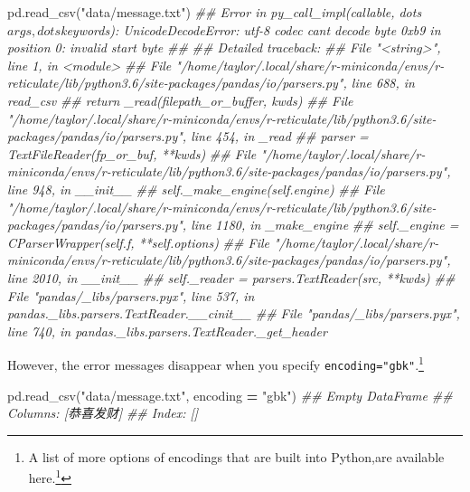 \documentclass[
  12pt,
  krantz2]{krantz}
\makeatletter
\newenvironment{Shaded}{\begin{snugshade}}{\end{snugshade}}
\newcommand{\CommentTok}[1]{\textcolor[rgb]{0.37,0.37,0.37}{\textit{#1}}}
\newcommand{\NormalTok}[1]{#1}
\newcommand{\OperatorTok}[1]{\textcolor[rgb]{0.43,0.43,0.43}{\textbf{#1}}}
\newcommand{\StringTok}[1]{\textcolor[rgb]{0.5,0.5,0.5}{#1}}
\renewcommand{\href}[2]{#2\footnote{\url{#1}}}
\newenvironment{kframe}{%
\medskip{}
\setlength{\fboxsep}{.8em}
 \def\at@end@of@kframe{}%
 \ifinner\ifhmode%
  \def\at@end@of@kframe{\end{minipage}}%
  \begin{minipage}{\columnwidth}%
 \fi\fi%
 \def\FrameCommand##1{\hskip\@totalleftmargin \hskip-\fboxsep
 \colorbox{shadecolor}{##1}\hskip-\fboxsep
     \hskip-\linewidth \hskip-\@totalleftmargin \hskip\columnwidth}%
 \MakeFramed {\advance\hsize-\width
   \@totalleftmargin\z@ \linewidth\hsize
   \@setminipage}}%
 {\par\unskip\endMakeFramed%
 \at@end@of@kframe}
\renewenvironment{Shaded}{\begin{kframe}}{\end{kframe}}
\makeatother
\begin{document}
\begin{Shaded}
\begin{Highlighting}[]
\NormalTok{pd.read\_csv(}\StringTok{"data/message.txt"}\NormalTok{)}
\CommentTok{\#\# Error in py\_call\_impl(callable, dots$args, dots$keywords): UnicodeDecodeError: \textquotesingle{}utf{-}8\textquotesingle{} codec can\textquotesingle{}t decode byte 0xb9 in position 0: invalid start byte}
\CommentTok{\#\# }
\CommentTok{\#\# Detailed traceback:}
\CommentTok{\#\#   File "\textless{}string\textgreater{}", line 1, in \textless{}module\textgreater{}}
\CommentTok{\#\#   File "/home/taylor/.local/share/r{-}miniconda/envs/r{-}reticulate/lib/python3.6/site{-}packages/pandas/io/parsers.py", line 688, in read\_csv}
\CommentTok{\#\#     return \_read(filepath\_or\_buffer, kwds)}
\CommentTok{\#\#   File "/home/taylor/.local/share/r{-}miniconda/envs/r{-}reticulate/lib/python3.6/site{-}packages/pandas/io/parsers.py", line 454, in \_read}
\CommentTok{\#\#     parser = TextFileReader(fp\_or\_buf, **kwds)}
\CommentTok{\#\#   File "/home/taylor/.local/share/r{-}miniconda/envs/r{-}reticulate/lib/python3.6/site{-}packages/pandas/io/parsers.py", line 948, in \_\_init\_\_}
\CommentTok{\#\#     self.\_make\_engine(self.engine)}
\CommentTok{\#\#   File "/home/taylor/.local/share/r{-}miniconda/envs/r{-}reticulate/lib/python3.6/site{-}packages/pandas/io/parsers.py", line 1180, in \_make\_engine}
\CommentTok{\#\#     self.\_engine = CParserWrapper(self.f, **self.options)}
\CommentTok{\#\#   File "/home/taylor/.local/share/r{-}miniconda/envs/r{-}reticulate/lib/python3.6/site{-}packages/pandas/io/parsers.py", line 2010, in \_\_init\_\_}
\CommentTok{\#\#     self.\_reader = parsers.TextReader(src, **kwds)}
\CommentTok{\#\#   File "pandas/\_libs/parsers.pyx", line 537, in pandas.\_libs.parsers.TextReader.\_\_cinit\_\_}
\CommentTok{\#\#   File "pandas/\_libs/parsers.pyx", line 740, in pandas.\_libs.parsers.TextReader.\_get\_header}
\end{Highlighting}
\end{Shaded}

However, the error messages disappear when you specify \texttt{encoding="gbk"}.\footnote{A list of more options of encodings that are built into Python,are available \href{https://docs.python.org/3/library/codecs.html\#standard-encodings}{here.}}

\begin{Shaded}
\begin{Highlighting}[]
\NormalTok{pd.read\_csv(}\StringTok{"data/message.txt"}\NormalTok{, encoding }\OperatorTok{=} \StringTok{"gbk"}\NormalTok{)}
\CommentTok{\#\# Empty DataFrame}
\CommentTok{\#\# Columns: [恭喜发财]}
\CommentTok{\#\# Index: []}
\end{Highlighting}
\end{Shaded}
\end{document}
